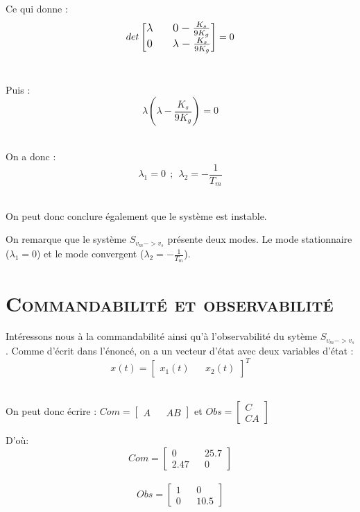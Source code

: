 \par Ce qui donne : $$det\large\begin{bmatrix}\lambda && 0-\frac{K_s}{9K_g} \\ 0 && \lambda-\frac{K_s}{9K_g} \end{bmatrix}\normalsize=0$$ \\

\par Puis :
$$\lambda(\lambda-\frac{K_s}{9K_g})=0$$ \\

\par On a donc :
$$\lambda_1=0~~;~~\lambda_2=-\frac{1}{T_m}$$ \\

\par On peut donc conclure également que le système est instable.\\

\par On remarque que le système $S_{v_m->v_s}$ présente deux modes. Le mode stationnaire ($\lambda_1=0$) et le mode convergent ($\lambda_2=-\frac{1}{T_m}$).\\

\section{\textsc{Commandabilité et observabilité}}

\par Intéressons nous à la commandabilité ainsi qu'à l'observabilité du sytème $S_{v_m->v_s}$. Comme d'écrit dans l'énoncé, on a un vecteur d'état avec deux variables d'état : $$x(t)=\begin{bmatrix}x_1(t)&&x_2(t)\end{bmatrix}^T$$\\

\par On peut donc écrire : $Com=\begin{bmatrix}A&&AB\end{bmatrix}$ et $Obs=\begin{bmatrix}C\\CA\end{bmatrix}$ \\

\par D'où: $$Com = \begin{bmatrix}0&&25.7\\2.47&&0\end{bmatrix}$$\\
$$Obs = \begin{bmatrix}1&&0\\0&&10.5\end{bmatrix}$$\\


